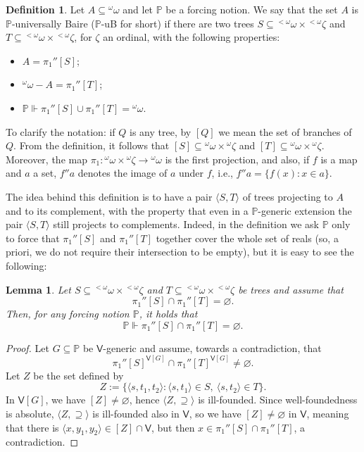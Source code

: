 \documentclass[10pt]{amsart}
\newtheorem{lemma}[theorem]{Lemma}
\theoremstyle{definition}
\newtheorem{definition}[theorem]{Definition}
\begin{document}
\begin{definition}
    Let $A\subseteq{}^\omega\omega$ and let $\mathbb P$ be a forcing notion. We say that the set $A$ is $\mathbb P$-universally Baire ($\mathbb P$-uB for short) if there are two trees $S\subseteq{}^{<\omega}\omega\times {}^{<\omega}\zeta$ and $T\subseteq{}^{<\omega}\omega\times{}^{<\omega}\zeta$, for $\zeta$ an ordinal, with the following properties:
    \begin{itemize}
        \item $A=\pi_1''[S]$;
        \item ${}^\omega\omega-A=\pi_1''[T]$;
        \item $\mathbb P\Vdash \pi_1''[S]\cup\pi_1''[T]={}^\omega\omega$. 
    \end{itemize}
\end{definition}

To clarify the notation: if $Q$ is any tree, by $[Q]$ we mean the set of branches of $Q$. From the definition, it follows that $[S]\subseteq {}^\omega\omega\times{}^\omega\zeta$ and $[T]\subseteq {}^\omega\omega\times{}^\omega\zeta$. Moreover, the map $\pi_1:{}^\omega\omega\times{}^\omega\zeta\to{}^\omega\omega$ is the first projection, and also, if $f$ is a map and $a$ a set, $f''a$ denotes the image of $a$ under $f$, i.e., $f''a=\{f(x):x\in a\}$.\medskip

The idea behind this definition is to have a pair $\langle S,T\rangle$ of trees projecting to $A$ and to its complement, with the property that even in a $\mathbb P$-generic extension the pair $\langle  S, T\rangle$ still projects to complements. Indeed, in the definition we ask $\mathbb P$ only to force that $\pi_1''[S]$ and $\pi_1''[T]$ together cover the whole set of reals (so, a priori, we do not require their intersection to be empty), but it is easy to see the following:
\begin{lemma}
    Let $S\subseteq{}^{<\omega} \omega\times{}^{<\omega}\zeta$ and $T\subseteq{}^{<\omega}\omega \times{}^{<\omega}\zeta$ be trees and assume that \[\pi_1''[S]\cap\pi_1''[T]=\varnothing.\] Then, for any forcing notion $\mathbb P$, it holds that
    \[\mathbb P\Vdash \pi_1''[S]\cap\pi_1''[T]=\varnothing.\]
\end{lemma}

\begin{proof}
Let $G\subseteq\mathbb P$ be $\mathsf V$-generic and assume, towards a contradiction, that
\[\pi_1''[S]^{\mathsf V[G]}\cap \pi_1''[T]^{\mathsf V[G]}\neq\varnothing.\]
Let $Z$ be the set defined by
\[Z:=\{\langle s,t_1,t_2\rangle: \langle s,t_1\rangle \in S,\ \langle s,t_2\rangle\in T\}.\]
In $\mathsf V[G]$, we have $[Z]\neq\varnothing$, hence $\langle Z,\supseteq\rangle$ is ill-founded. Since well-foundedness is absolute, $\langle Z,\supseteq\rangle$ is ill-founded also in $\mathsf V$, so we have $[Z]\neq\varnothing$ in $\mathsf V$, meaning that there is $\langle x,y_1,y_2\rangle\in [Z]\cap\mathsf V$, but then $x\in \pi_1''[S]\cap\pi_1''[T]$, a contradiction.
\end{proof}
\end{document}

